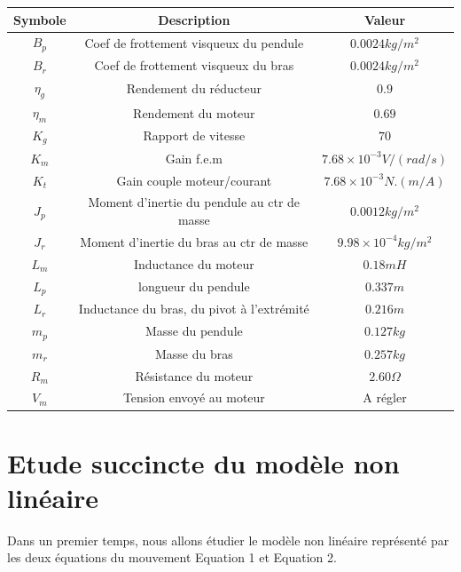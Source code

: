 \documentclass[12pt, a4paper, openany]{report}
\begin{document}
\begin{center}
\begin{tabular}{|c|c|c|}
\hline \rowcolor{rougecerise} Symbole & Description &  Valeur  \\
\hline $B_{p}$  &  Coef de frottement visqueux du pendule  & $0.0024 kg/m^{2}$   \\
\hline $B_{r}$ & Coef de frottement visqueux du bras & $0.0024 kg/m^{2}$ \\
\hline $\eta_{g}$  &  Rendement du réducteur  & $0.9$  \\
\hline $\eta_{m}$  &  Rendement du moteur  & $0.69$  \\
\hline $K_{g}$  &  Rapport de vitesse  & $70$  \\
\hline $K_{m}$  &  Gain f.e.m  & $7.68\times10^{-3} V/(rad/s)$ \\
\hline $K_{t}$  &  Gain couple moteur/courant  & $7.68\times10^{-3} N.(m/A)$\\
\hline $J_{p}$ &  Moment d'inertie du pendule au ctr de masse & $0.0012 kg/m^{2}$ \\
\hline $J_{r}$  &  Moment d'inertie du bras au ctr de masse  & $9.98\times10^{-4} kg/m^{2}$ \\
\hline $L_{m}$  &   Inductance du moteur & $0.18 mH$\\
\hline $L_{p}$  &  longueur du pendule  & $0.337 m$ \\
\hline $L_{r}$  &  Inductance du bras, du pivot à l'extrémité   & $0.216 m$ \\
\hline $m_{p}$  &  Masse du pendule  & $0.127 kg$\\
\hline $m_{r}$  &   Masse du bras  & $0.257 kg$\\
\hline $R_{m}$  &   Résistance du moteur  & $2.60 \Omega$ \\
\hline $V_{m}$  &  Tension envoyé au moteur   &  A régler \\

\hline 
\end{tabular}
\label{tab2}
\end{center} 

\section{Etude succincte du modèle non linéaire}

Dans un premier temps, nous allons étudier le modèle non linéaire représenté par les deux équations du mouvement Equation 1 et Equation 2.
\end{document}
